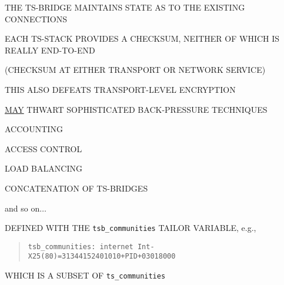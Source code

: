\begin{bwslide}

\begin{nrtc}
\item	THE TS-BRIDGE MAINTAINS STATE AS TO THE EXISTING CONNECTIONS

\item	EACH TS-STACK PROVIDES A CHECKSUM,
	NEITHER OF WHICH IS REALLY END-TO-END
    \begin{nrtc}
    \item	(CHECKSUM AT EITHER TRANSPORT OR NETWORK SERVICE)
    \end{nrtc}

\item	THIS ALSO DEFEATS TRANSPORT-LEVEL ENCRYPTION

\item	\underline{MAY} THWART SOPHISTICATED BACK-PRESSURE TECHNIQUES
\end{nrtc}
\end{bwslide}


\begin{bwslide}

\begin{nrtc}
\item	ACCOUNTING

\item	ACCESS CONTROL

\item	LOAD BALANCING

\item	CONCATENATION OF TS-BRIDGES

\item	and so on$\ldots$
\end{nrtc}
\end{bwslide}


\begin{bwslide}

\begin{nrtc}
\item	DEFINED WITH THE \verb"tsb_communities" TAILOR VARIABLE, e.g.,
\begin{quote}\small\begin{verbatim}
tsb_communities: internet Int-X25(80)=31344152401010+PID+03018000
\end{verbatim}\end{quote}

\item	WHICH IS A SUBSET OF \verb"ts_communities"
\end{nrtc}
\end{bwslide}


